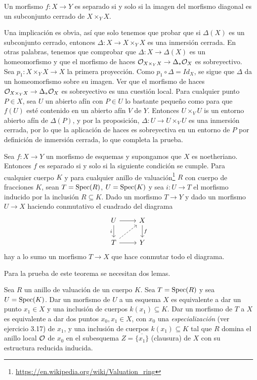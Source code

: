 \documentclass[GA.tex]{subfiles}
\begin{document}
\begin{coro}
Un morfismo $f:X\to Y$ es separado si y solo si la imagen del morfismo diagonal es un subconjunto cerrado de $X\times_Y X$.
\end{coro}
\begin{dem}
Una implicación es obvia, así que solo tenemos que probar que si $\Delta(X)$ es un subconjunto cerrado, entonces $\Delta:X\to X\times_Y X$ es una inmersión cerrada. En otras palabras, tenemos que comprobar que $\Delta:X\to \Delta(X)$ es un homeomorfismo y que el morfismo de haces ${\mathcal O}_{X\times_Y X}\to\Delta_*{\mathcal O}_X$ es sobreyectivo. Sea $p_1:X\times_Y X\to X$ la primera proyección. Como $p_1\circ\Delta=Id_X$, se sigue que $\Delta$ da un homeomorfismo sobre su imagen. Ver que el morfismo de haces ${\mathcal O}_{X\times_Y X}\to\Delta_*{\mathcal O}_X$ es sobreyectivo es una cuestión local. Para cualquier punto $P\in X$, sea $U$ un abierto afín con $P\in U$ lo bastante pequeño como para que $f(U)$ esté contenido en un abierto afín $V$ de $Y$. Entonces $U\times_V U$ is un entorno abierto afín de $\Delta(P)$, y por la proposición, $\Delta:U\to U\times_V U$ es una inmersión cerrada, por lo que la aplicación de haces es sobreyectiva en un entorno de $P$ por definición de inmersión cerrada, lo que completa la prueba.  
\end{dem}

\begin{teorema}
Sea $f:X\to Y$ un morfismo de esquemas y supongamos que $X$ es noetheriano. Entonces $f$ es separado si y solo si la siguiente condición se cumple. Para cualquier cuerpo $K$ y para cualquier anillo de valuación\footnote{\url{https://en.wikipedia.org/wiki/Valuation_ring}} $R$ con cuerpo de fracciones $K$, sean $T=\operatorname{Spec}(R)$, $U=\operatorname{Spec}(K)$ y sea $i:U\to T$ el morfismo inducido por la inclusión $R\subseteq K$. Dado un morfismo $T\to Y$ y dado un morfismo $U\to X$ haciendo conmutativo el cuadrado del diagrama
\[
\begin{tikzcd}
U\arrow[r]\arrow[d, "i"'] & X\arrow[d, "f"]\\
T\arrow[r]\arrow[ur, dashed] & Y
\end{tikzcd}
\]
hay a lo sumo un morfismo $T\to X$ que hace conmutar todo el diagrama. 
\end{teorema}

Para la prueba de este teorema se necesitan dos lemas.

\begin{lemma}
Sea $R$ un anillo de valuación de un cuerpo $K$. Sea $T=\operatorname{Spec}(R)$ y sea $U=\operatorname{Spec}(K)$. Dar un morfismo de $U$ a un esquema $X$ es equivalente a dar un punto $x_1\in X$ y una inclusión de cuerpos $k(x_1)\subseteq K$. Dar un morfismo de $T$ a $X$ es equivalente a dar dos puntos $x_0,x_1\in X$, con $x_0$ una \emph{especialización } (ver ejercicio 3.17) de $x_1$, y una inclusión de cuerpos $k(x_1)\subseteq K$ tal que $R$ domina el anillo local ${\mathcal O}$ de $x_0$ en el subesquema $Z=\overline{\{x_1\}}$ (clausura) de $X$ con su estructura reducida inducida. 
\end{lemma}
\end{document}
